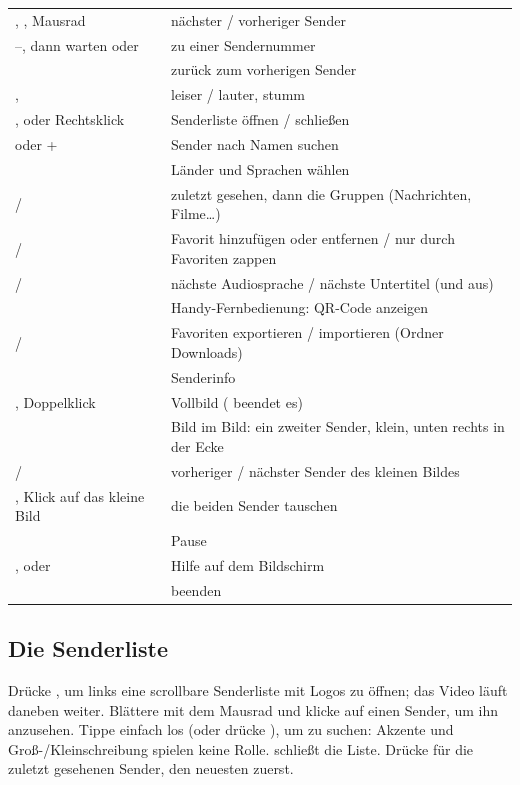 \begin{xltabular}{\linewidth}{@{}KX@{}}
\key{$\uparrow$} \key{$\downarrow$},  , Mausrad & nächster / vorheriger Sender \\
--, dann warten oder  & zu einer Sendernummer \\
 & zurück zum vorherigen Sender \\
\key{$\leftarrow$} \key{$\rightarrow$},  & leiser / lauter, stumm \\
,  oder Rechtsklick & Senderliste öffnen / schließen \\
\key{/} oder + & Sender nach Namen suchen \\
 & Länder und Sprachen wählen \\
 /  & zuletzt gesehen, dann die Gruppen (Nachrichten, Filme\ldots) \\
 /  & Favorit hinzufügen oder entfernen / nur durch Favoriten zappen \\
 /  & nächste Audiosprache / nächste Untertitel (und aus) \\
 & Handy-Fernbedienung: QR-Code anzeigen \\
 /  & Favoriten exportieren / importieren (Ordner Downloads) \\
 & Senderinfo \\
, Doppelklick & Vollbild ( beendet es) \\
 & Bild im Bild: ein zweiter Sender, klein, unten rechts in der Ecke \\
\key{[} / \key{]} & vorheriger / nächster Sender des kleinen Bildes \\
, Klick auf das kleine Bild & die beiden Sender tauschen \\
 & Pause \\
,  oder  & Hilfe auf dem Bildschirm \\
 & beenden \\
\bottomrule
\end{xltabular}

\subsection{Die Senderliste}
Drücke , um links eine scrollbare Senderliste mit Logos zu öffnen;
das Video läuft daneben weiter. Blättere mit dem Mausrad und klicke auf einen
Sender, um ihn anzusehen. Tippe einfach los (oder drücke \key{/}), um zu
suchen: Akzente und Groß-/Kleinschreibung spielen keine Rolle. 
schließt die Liste. Drücke  für die zuletzt gesehenen Sender, den
neuesten zuerst.

